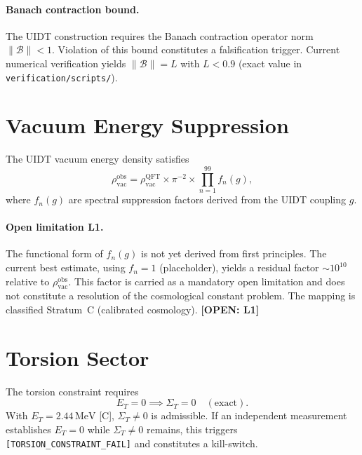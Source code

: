 \documentclass[12pt,a4paper]{article}
\newcommand{\UIDT}{\textsc{UIDT}}
\newcommand{\rvac}{\rho_{\mathrm{vac}}}
\newcommand{\rhobs}{\rho_{\mathrm{vac}}^{\mathrm{obs}}}
\newcommand{\openitem}[1]{\textbf{[OPEN: #1]}}
\begin{document}
\paragraph{Banach contraction bound.}
The \UIDT{} construction requires the Banach contraction operator norm
$\|\mathcal{B}\| < 1$. Violation of this bound constitutes a falsification
trigger. Current numerical verification yields $\|\mathcal{B}\| = L$
with $L < 0.9$ (exact value in \texttt{verification/scripts/}).

\section{Vacuum Energy Suppression}
\label{sec:vacuum}

The \UIDT{} vacuum energy density satisfies
\begin{equation}
  \rvac^{\mathrm{obs}} =
  \rvac^{\mathrm{QFT}} \times \pi^{-2}
  \times \prod_{n=1}^{99} f_n(g),
  \label{eq:vacuum}
\end{equation}
where $f_n(g)$ are spectral suppression factors derived from the
\UIDT{} coupling $g$.

\paragraph{Open limitation L1.}
The functional form of $f_n(g)$ is not yet derived from first principles.
The current best estimate, using $f_n = 1$ (placeholder), yields a
residual factor $\sim 10^{10}$ relative to $\rhobs$.
This factor is carried as a mandatory open limitation and does not
constitute a resolution of the cosmological constant problem.
The mapping is classified Stratum~C (calibrated cosmology).
\openitem{L1}

\section{Torsion Sector}
\label{sec:torsion}

The torsion constraint requires
\begin{equation}
  E_T = 0 \implies \Sigma_T = 0\quad (\text{exact}).
  \label{eq:torsion}
\end{equation}
With $E_T = 2.44\,\text{MeV}$ [C], $\Sigma_T \neq 0$ is admissible.
If an independent measurement establishes $E_T = 0$ while $\Sigma_T \neq 0$
remains, this triggers \texttt{[TORSION\_CONSTRAINT\_FAIL]} and constitutes
a kill-switch.
\end{document}
